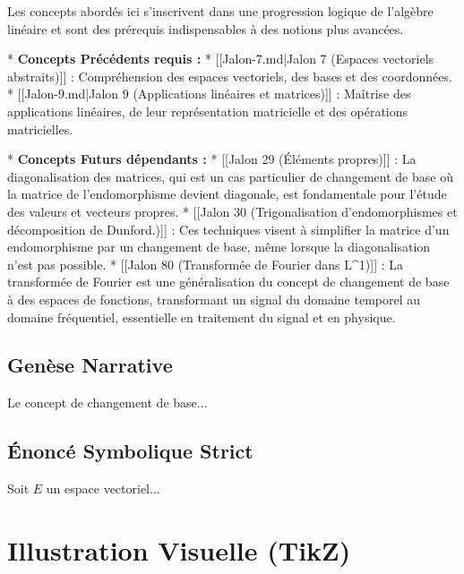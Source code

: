 \documentclass{report}
\begin{document}
Les concepts abordés ici s'inscrivent dans une progression logique de l'algèbre linéaire et sont des prérequis indispensables à des notions plus avancées.

*   \textbf{Concepts Précédents requis :}
    *   [[Jalon-7.md|Jalon 7 (Espaces vectoriels abstraits)]] : Compréhension des espaces vectoriels, des bases et des coordonnées.
    *   [[Jalon-9.md|Jalon 9 (Applications linéaires et matrices)]] : Maîtrise des applications linéaires, de leur représentation matricielle et des opérations matricielles.

*   \textbf{Concepts Futurs dépendants :}
    *   [[Jalon 29 (Éléments propres)]] : La diagonalisation des matrices, qui est un cas particulier de changement de base où la matrice de l'endomorphisme devient diagonale, est fondamentale pour l'étude des valeurs et vecteurs propres.
    *   [[Jalon 30 (Trigonalisation d'endomorphismes et décomposition de Dunford.)]] : Ces techniques visent à simplifier la matrice d'un endomorphisme par un changement de base, même lorsque la diagonalisation n'est pas possible.
    *   [[Jalon 80 (Transformée de Fourier dans L^1)]] : La transformée de Fourier est une généralisation du concept de changement de base à des espaces de fonctions, transformant un signal du domaine temporel au domaine fréquentiel, essentielle en traitement du signal et en physique.

\subsection*{Genèse Narrative}

Le concept de changement de base...

\subsection*{Énoncé Symbolique Strict}

Soit $E$ un espace vectoriel...
\section*{Illustration Visuelle (TikZ)}
\begin{center}
\end{center}
\end{document}
